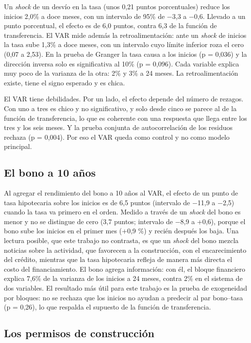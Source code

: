 \documentclass[11pt,a4paper]{article}
\begin{document}
Un \emph{shock} de un desvío en la tasa (unos 0,21 puntos porcentuales) reduce los inicios 2,0\% a doce meses, con un intervalo de 95\% de $-$3,3 a $-$0,6. Llevado a un punto porcentual, el efecto es de 6,0 puntos, contra 6,3 de la función de transferencia. El VAR mide además la retroalimentación: ante un \emph{shock} de inicios la tasa sube 1,3\% a doce meses, con un intervalo cuyo límite inferior roza el cero (0,07 a 2,53). En la prueba de Granger la tasa causa a los inicios (p = 0,036) y la dirección inversa solo es significativa al 10\% (p = 0,096). Cada variable explica muy poco de la varianza de la otra: 2\% y 3\% a 24 meses. La retroalimentación existe, tiene el signo esperado y es chica.

El VAR tiene debilidades. Por un lado, el efecto depende del número de rezagos. Con uno a tres es chico y no significativo, y solo desde cinco se parece al de la función de transferencia, lo que es coherente con una respuesta que llega entre los tres y los seis meses. Y la prueba conjunta de autocorrelación de los residuos rechaza (p = 0,004). Por eso el VAR queda como control y no como modelo principal.

\subsection{El bono a 10 años}

{Al agregar el rendimiento del bono a 10 años al VAR, el efecto de un punto de tasa hipotecaria sobre los inicios es de 6,5 puntos (intervalo de $-$11,9 a $-$2,5) cuando la tasa va primero en el orden. Medido a través de un \emph{shock} del bono es menor y no se distingue de cero (3,7 puntos; intervalo de $-$8,9 a +0,6), porque el bono sube los inicios en el primer mes (+0,9 \%) y recién después los baja. Una lectura posible, que este trabajo no contrasta, es que un \emph{shock} del bono mezcla noticias sobre la actividad, que favorecen a la construcción, con el encarecimiento del crédito, mientras que la tasa hipotecaria refleja de manera más directa el costo del financiamiento. El bono agrega información: con él, el bloque financiero explica 7,6\% de la varianza de los inicios a 24 meses, contra 2\% en el sistema de dos variables. El resultado más útil para este trabajo es la prueba de exogeneidad por bloques: no se rechaza que los inicios no ayudan a predecir al par bono--tasa (p = 0,26), lo que respalda el supuesto de la función de transferencia.}

\subsection{Los permisos de construcción}
\end{document}
